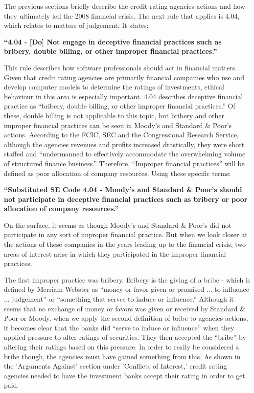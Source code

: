 \documentclass[11pt]{article}
\begin{document}
\begin{multicols}{2}
The previous sections briefly describe the credit rating agencies actions and how they ultimately led the 2008 financial crisis.  The next rule that applies is 4.04, which relates to matters of judgement.  It states:


   \textbf{``4.04 - [Do] Not engage in deceptive financial practices such as bribery, double billing, or other improper financial practices.''}


This rule describes how software professionals should act in financial matters.  Given that credit rating agencies are primarily financial companies who use and develop computer models to determine the ratings of investments, ethical behaviour in this area is especially important.  
4.04 describes deceptive financial practice as ``bribery, double billing, or other improper financial practices.''  Of these, double billing is not applicable to this topic, but bribery and other improper financial practices can be seen in Moody's and Standard \& Poor's actions.  According to the FCIC, SEC and the Congressional Research Service, although the agencies revenues and profits increased drastically, they were short staffed and ``undermanned to effectively accommodate the overwhelming volume of structured finance business.'' \cite[pg. 7]{CRS, govtReport, secCRAreport} Therefore, ``Improper financial practices'' will be defined as poor allocation of company resources.  
Using these specific terms:


   \textbf{``Substituted SE Code 4.04 - Moody's and Standard \& Poor's should not participate in deceptive financial practices such as bribery or poor allocation of company resources.''}


On the surface, it seems as though Moody's and Standard \& Poor's did not participate in any sort of improper financial practice.  But when we look closer at the actions of these companies in the years leading up to the financial crisis, two areas of interest arise in which they participated in the improper financial practices.  

The first improper practice was bribery.  Bribery is the giving of a bribe - which is defined by Merriam Webster as ``money or favor given or promised ... to influence ... judgement'' or ``something that serves to induce or influence.'' \cite{bribeDef}  Although it seems that no exchange of money or favors was given or received by Standard \& Poor or Moody, when we apply the second definition of bribe to agencies actions, it becomes clear that the banks did ``serve to induce or influence'' when they applied pressure to alter ratings of securities.  They then accepted the ``bribe'' by altering their ratings based on this pressure.  In order to really be considered a bribe though, the agencies must have gained something from this.
As shown in the 'Arguments Against' section under 'Conflicts of Interest,' credit rating agencies needed to have the investment banks accept their rating in order to get paid.



\end{multicols}
\end{document}
